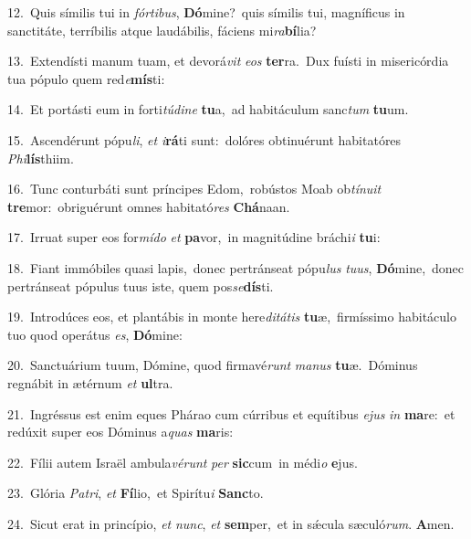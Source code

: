 {\numbfont\textcolor{\numbcolor}{12.}}~Quis símilis tui in \textit{fór}\-\textit{ti}\textit{bus}, \textbf{Dó}\-mine?~\star quis símilis tui, magníficus in sanctitáte, terríbilis atque laudábilis, fáciens mi\-\textit{ra}\-\textbf{bí}lia?\par
{\numbfont\textcolor{\numbcolor}{13.}}~Extendísti manum tuam, et devorá\textit{vit} \textit{e}\-\textit{os} \textbf{ter}\-ra.~\star Dux fuísti in misericórdia tua pópulo quem red\-\textit{e}\-\textbf{mís}ti:\par
{\numbfont\textcolor{\numbcolor}{14.}}~Et portásti eum in forti\-\textit{tú}\-\textit{di}\textit{ne} \textbf{tu}\-a,~\star ad habitáculum sanc\textit{tum} \textbf{tu}\-um.\par
{\numbfont\textcolor{\numbcolor}{15.}}~Ascendérunt pópu\-\textit{li}\-, \textit{et} \textit{i}\-\textbf{rá}ti sunt:~\star dolóres obtinuérunt habitatóres \textit{Phi}\-\textbf{lís}thiim.\par
{\numbfont\textcolor{\numbcolor}{16.}}~Tunc conturbáti sunt príncipes Edom,~\dagger robústos Moab ob\-\textit{tí}\-\textit{nu}\textit{it} \textbf{tre}\-mor:~\star obriguérunt omnes habitató\textit{res} \textbf{Chá}\-naan.\par
{\numbfont\textcolor{\numbcolor}{17.}}~Irruat super eos for\-\textit{mí}\-\textit{do} \textit{et} \textbf{pa}\-vor,~\star in magnitúdine bráchi\textit{i} \textbf{tu}\-i:\par
{\numbfont\textcolor{\numbcolor}{18.}}~Fiant immóbiles quasi lapis,~\dagger donec pertránseat pópu\textit{lus} \textit{tu}\-\textit{us}, \textbf{Dó}\-mine,~\star donec pertránseat pópulus tuus iste, quem pos\-\textit{se}\-\textbf{dís}ti.\par
{\numbfont\textcolor{\numbcolor}{19.}}~Introdúces eos, et plantábis in monte here\-\textit{di}\-\textit{tá}\textit{tis} \textbf{tu}\-æ,~\star firmíssimo habitáculo tuo quod operátus \textit{es}\-, \textbf{Dó}\-mine:\par
{\numbfont\textcolor{\numbcolor}{20.}}~Sanctuárium tuum, Dómine, quod firmavé\textit{runt} \textit{ma}\-\textit{nus} \textbf{tu}\-æ.~\star Dóminus regnábit in ætérnum \textit{et} \textbf{ul}\-tra.\par
{\numbfont\textcolor{\numbcolor}{21.}}~Ingréssus est enim eques Phárao cum cúrribus et equítibus \textit{e}\-\textit{jus} \textit{in} \textbf{ma}\-re:~\star et redúxit super eos Dóminus a\textit{quas} \textbf{ma}\-ris:\par
{\numbfont\textcolor{\numbcolor}{22.}}~Fílii autem Israël ambula\-\textit{vé}\-\textit{runt} \textit{per} \textbf{sic}\-cum~\star in médi\textit{o} \textbf{e}\-jus.\par
{\numbfont\textcolor{\numbcolor}{23.}}~Glória \textit{Pa}\-\textit{tri}, \textit{et} \textbf{Fí}\-lio,~\star et Spirítu\textit{i} \textbf{Sanc}\-to.\par
{\numbfont\textcolor{\numbcolor}{24.}}~Sicut erat in princípio, \textit{et} \textit{nunc}\-, \textit{et} \textbf{sem}\-per,~\star et in sǽcula sæculó\-\textit{rum}\-. \textbf{A}\-men.\par
